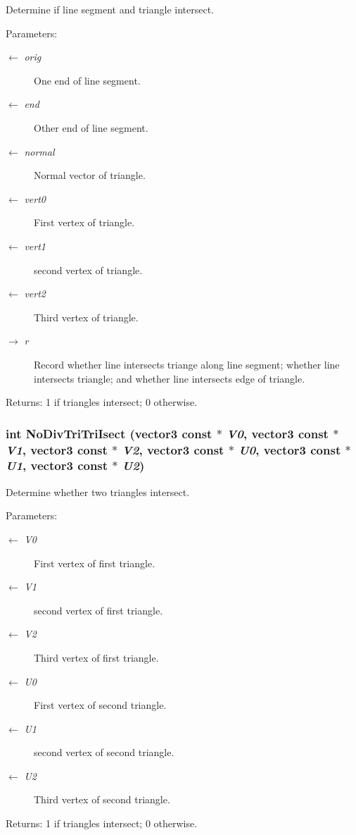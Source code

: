 Determine if line segment and triangle intersect. \begin{Desc}
\item[Parameters:]
\begin{description}
\item[\mbox{$\leftarrow$} {\em orig}]One end of line segment. \item[\mbox{$\leftarrow$} {\em end}]Other end of line segment. \item[\mbox{$\leftarrow$} {\em normal}]Normal vector of triangle. \item[\mbox{$\leftarrow$} {\em vert0}]First vertex of triangle. \item[\mbox{$\leftarrow$} {\em vert1}]second vertex of triangle. \item[\mbox{$\leftarrow$} {\em vert2}]Third vertex of triangle. \item[\mbox{$\rightarrow$} {\em r}]Record whether line intersects triange along line segment; whether line intersects triangle; and whether line intersects edge of triangle. \end{description}
\end{Desc}
\begin{Desc}
\item[Returns:]1 if triangles intersect; 0 otherwise. \end{Desc}
\subsubsection{\setlength{\rightskip}{0pt plus 5cm}int No\-Div\-Tri\-Tri\-Isect ({\bf vector3} const $\ast$ {\em V0}, {\bf vector3} const $\ast$ {\em V1}, {\bf vector3} const $\ast$ {\em V2}, {\bf vector3} const $\ast$ {\em U0}, {\bf vector3} const $\ast$ {\em U1}, {\bf vector3} const $\ast$ {\em U2})}\label{opttritri_8cc_964292b46316fc46d2be9ca9570deb64}


Determine whether two triangles intersect. \begin{Desc}
\item[Parameters:]
\begin{description}
\item[\mbox{$\leftarrow$} {\em V0}]First vertex of first triangle. \item[\mbox{$\leftarrow$} {\em V1}]second vertex of first triangle. \item[\mbox{$\leftarrow$} {\em V2}]Third vertex of first triangle. \item[\mbox{$\leftarrow$} {\em U0}]First vertex of second triangle. \item[\mbox{$\leftarrow$} {\em U1}]second vertex of second triangle. \item[\mbox{$\leftarrow$} {\em U2}]Third vertex of second triangle. \end{description}
\end{Desc}
\begin{Desc}
\item[Returns:]1 if triangles intersect; 0 otherwise. \end{Desc}
